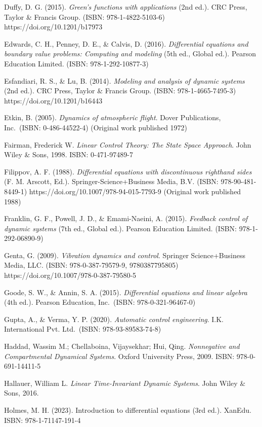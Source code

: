\documentclass[
  11pt,
]{article}
\begin{document}
Duffy, D. G. (2015). \emph{Green's functions with applications} (2nd
ed.). CRC Press, Taylor \& Francis Group. (ISBN: 978-1-4822-5103-6)
https://doi.org/10.1201/b17973

Edwards, C. H., Penney, D. E., \& Calvis, D. (2016). \emph{Differential
equations and boundary value problems: Computing and modeling} (5th ed.,
Global ed.). Pearson Education Limited. (ISBN: 978-1-292-10877-3)

Esfandiari, R. S., \& Lu, B. (2014). \emph{Modeling and analysis of
dynamic systems} (2nd ed.). CRC Press, Taylor \& Francis Group. (ISBN:
978-1-4665-7495-3) https://doi.org/10.1201/b16443

Etkin, B. (2005). \emph{Dynamics of atmospheric flight}. Dover
Publications, Inc.~(ISBN: 0-486-44522-4) (Original work published 1972)

Fairman, Frederick W. \emph{Linear Control Theory: The State Space
Approach}. John Wiley \& Sons, 1998. ISBN: 0-471-97489-7

Filippov, A. F. (1988). \emph{Differential equations with discontinuous
righthand sides} (F. M. Arscott, Ed.). Springer-Science+Business Media,
B.V. (ISBN: 978-90-481-8449-1) https://doi.org/10.1007/978-94-015-7793-9
(Original work published 1988)

Franklin, G. F., Powell, J. D., \& Emami-Naeini, A. (2015).
\emph{Feedback control of dynamic systems} (7th ed., Global ed.).
Pearson Education Limited. (ISBN: 978-1-292-06890-9)

Genta, G. (2009). \emph{Vibration dynamics and control}. Springer
Science+Business Media, LLC. (ISBN: 978-0-387-79579-9, 9780387795805)
https://doi.org/10.1007/978-0-387-79580-5

Goode, S. W., \& Annin, S. A. (2015). \emph{Differential equations and
linear algebra} (4th ed.). Pearson Education, Inc.~(ISBN:
978-0-321-96467-0)

Gupta, A., \& Verma, Y. P. (2020). \emph{Automatic control engineering}.
I.K. International Pvt. Ltd.~(ISBN: 978-93-89583-74-8)

Haddad, Wassim M.; Chellaboina, Vijaysekhar; Hui, Qing.
\emph{Nonnegative and Compartmental Dynamical Systems}. Oxford
University Press, 2009. ISBN: 978-0-691-14411-5

Hallauer, William L. \emph{Linear Time-Invariant Dynamic Systems}. John
Wiley \& Sons, 2016.

Holmes, M. H. (2023). Introduction to differential equations (3rd ed.).
XanEdu. ISBN: 978-1-71147-191-4
\end{document}
